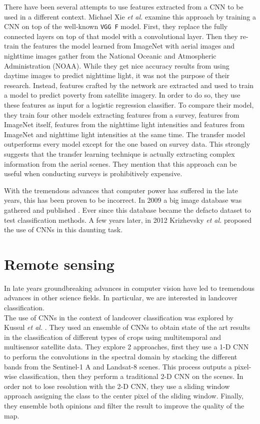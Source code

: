 There have been several attempts to use features extracted from a CNN to be used in a different context. Michael Xie \textit{et al.} \cite{DBLP:journals/corr/XieJBLE15} examine this approach by training a CNN on top of the well-known \texttt{VGG F} model. First, they replace the fully connected layers on top of that model with a convolutional layer. Then they re-train the features the model learned from ImageNet with aerial images and nighttime images gather from the National Oceanic and Atmospheric Administration (NOAA). While they get nice accuracy results from using daytime images to predict nighttime light, it was not the purpose of their research. Instead, features crafted by the network are extracted and used to train a model to predict poverty from satellite imagery. In order to do so, they use these features as input for a logistic regression classifier. To compare their model, they train four other models extracting features from a survey, features from ImageNet itself, features from the nighttime light intensities and features from ImageNet and nighttime light intensities at the same time. The transfer model outperforms every model except for the one based on survey data. This strongly suggests that the transfer learning technique is actually extracting complex information from the aerial scenes. They mention that this approach can be useful when conducting surveys is prohibitively expensive.


With the tremendous advances that computer power has suffered in the late years, this has been proven to be incorrect. In 2009 a big image database was gathered and published \cite{Deng09imagenet:a}. Ever since this database became the defacto dataset to test classification methods. A few years later, in 2012 Krizhevsky \textit{et al.} \cite{krizhevsky} proposed the use of CNNs in this daunting task.\\

\section{Remote sensing}

In late years groundbreaking advances in computer vision have led to tremendous advances in other science fields. In particular, we are interested in landcover classification.\\

The use of CNNs in the context of landcover classification was explored by Kussul \textit{et al.} \cite{7891032}. They used an ensemble of CNNs to obtain state of the art results in the classification of different types of crops using multitemporal and multisensor satellite data. They explore 2 approaches, first they use a 1-D CNN to perform the convolutions in the spectral domain by stacking the different bands from the Sentinel-1 A and Landsat-8 scenes. This process outputs a pixel-wise classification, then they perform a traditional 2-D CNN on the scenes. In order not to lose resolution with the 2-D CNN, they use a sliding window approach assigning the class to the center pixel of the sliding window. Finally, they ensemble both opinions and filter the result to improve the quality of the map.

